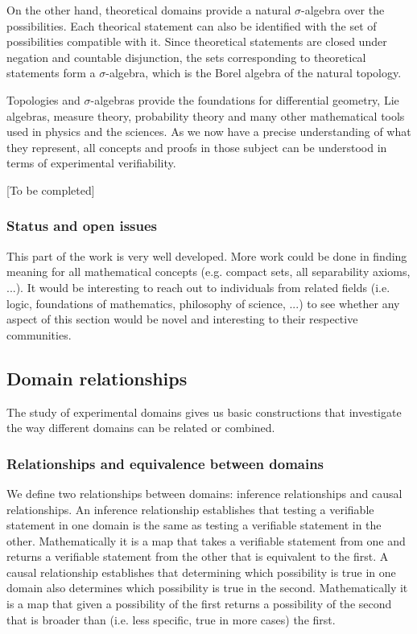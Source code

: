 \documentclass[twocolumn]{article}
\begin{document}
On the other hand, theoretical domains provide a natural $\sigma$-algebra over the possibilities. Each theorical statement can also be identified with the set of possibilities compatible with it. Since theoretical statements are closed under negation and countable disjunction, the sets corresponding to theoretical statements form a $\sigma$-algebra, which is the Borel algebra of the natural topology.

Topologies and $\sigma$-algebras provide the foundations for differential geometry, Lie algebras, measure theory, probability theory and many other mathematical tools used in physics and the sciences. As we now have a precise understanding of what they represent, all concepts and proofs in those subject can be understood in terms of experimental verifiability.

[To be completed]


\subsubsection{Status and open issues}

This part of the work is very well developed. More work could be done in finding meaning for all mathematical concepts (e.g. compact sets, all separability axioms, ...). It would be interesting to reach out to individuals from related fields (i.e. logic, foundations of mathematics, philosophy of science, ...) to see whether any aspect of this section would be novel and interesting to their respective communities.

\subsection{Domain relationships}

The study of experimental domains gives us basic constructions that investigate the way different domains can be related or combined.

\subsubsection{Relationships and equivalence between domains}

We define two relationships between domains: inference relationships and causal relationships. An inference relationship establishes that testing a verifiable statement in one domain is the same as testing a verifiable statement in the other. Mathematically it is a map that takes a verifiable statement from one and returns a verifiable statement from the other that is equivalent to the first. A causal relationship establishes that determining which possibility is true in one domain also determines which possibility is true in the second. Mathematically it is a map that given a possibility of the first returns a possibility of the second that is broader than (i.e. less specific, true in more cases) the first.
\end{document}
